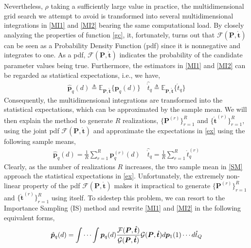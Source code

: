 \documentclass[review]{elsarticle}
\begin{document}
Nevertheless, $\rho$ taking a sufficiently large value in practice, the multidimensional grid search we attempt to avoid is transformed into several multidimensional integrations in \eqref{MI1} and \eqref{MI2} bearing the same computational load. By closely analyzing the properties of function \eqref{gc}, it, fortunately, turns out that $\mathcal{F}(\boldsymbol{P},\mathring{\boldsymbol{t}})$ can be seen as a Probability Density Function (pdf) since it is nonnegative and integrates to one. As a pdf, $\mathcal{F}(\boldsymbol{P},\mathring{\boldsymbol{t}})$ indicates the probability of the candidate parameter values being true. Furthermore, the estimators in \eqref{MI1} and \eqref{MI2} can be regarded as statistical expectations, i.e., we have,
\begin{align}\label{ex}
    \hat{\boldsymbol{p}}_q(d)\triangleq \mathbb{E}_{\boldsymbol{P},\mathring{\boldsymbol{t}}}\{\boldsymbol{p}_q(d)\} \quad \hat{\mathring{t}}_q\triangleq \mathbb{E}_{\boldsymbol{P},\mathring{\boldsymbol{t}}}\{\mathring{t}_q\}
\end{align}
Consequently, the multidimensional integrations are transformed into the statistical expectations, which can be approximated by the sample mean. 
We will then explain the method to generate $R$ realizations, $\lbrace \boldsymbol{P}^{(r)}\rbrace_{r=1}^R$ and $\lbrace \mathring{\boldsymbol{t}}^{(r)}\rbrace_{r=1}^R$, using the joint pdf $\mathcal{F}(\boldsymbol{P},\mathring{\boldsymbol{t}})$ and approximate the expectations in \eqref{ex} using the following sample means,
\begin{align}\label{SM}
    \hat{\boldsymbol{p}}_q(d)=\frac{1}{R}\sum_{r=1}^R \boldsymbol{p}_q^{(r)}(d) \quad \hat{\mathring{t}}_q=\frac{1}{R}\sum_{r=1}^R \mathring{t}_q^{(r)}
\end{align}
Clearly, as the number of realizations $R$ increases, the two sample mean in \eqref{SM} approach the statistical expectations in \eqref{ex}. Unfortunately, the extremely non-linear property of the pdf $\mathcal{F}(\boldsymbol{P},\mathring{\boldsymbol{t}})$ makes it impractical to generate $\lbrace \boldsymbol{P}^{(r)}\rbrace_{r=1}^R$ and $\lbrace \mathring{\boldsymbol{t}}^{(r)}\rbrace_{r=1}^R$ using itself. To sidestep this problem, we can resort to the Importance Sampling (IS) method \cite{ISdoa2008,Kay2000Mean} and rewrite \eqref{MI1} and \eqref{MI2} in the following equivalent forms,
\begin{align}\label{IS-P}
    \hat{\boldsymbol{p}}_q(d)=\idotsint \boldsymbol{p}_q(d) \frac{\mathcal{F}(\boldsymbol{P},\mathring{\boldsymbol{t}})}{\mathcal{G}(\boldsymbol{P},\mathring{\boldsymbol{t}})}\mathcal{G}(\boldsymbol{P},\mathring{\boldsymbol{t}})d\boldsymbol{p}_1(1) \cdots d\mathring{t}_Q
\end{align}
\end{document}
